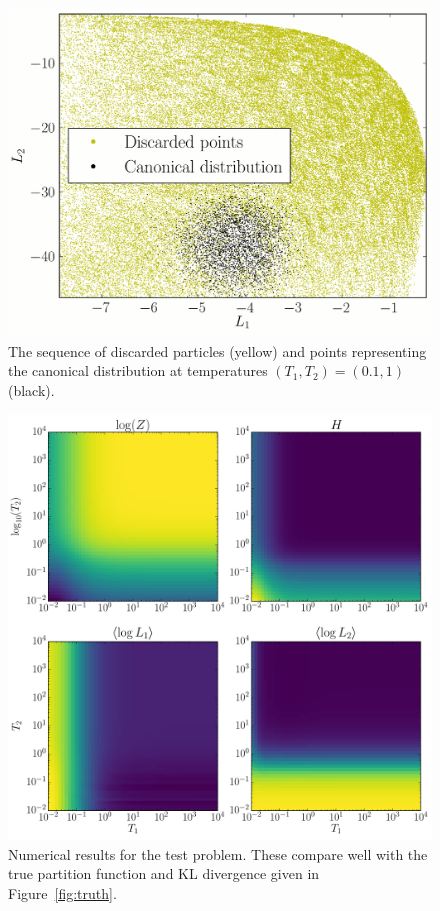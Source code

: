 \documentclass[journal,article,accept,moreauthors,pdftex,12pt,a4paper]{mdpi}
\begin{document}
\begin{figure}
\centering
\includegraphics[scale=1]{figures/output.png}
\caption{The sequence of discarded particles (yellow) and
points representing the canonical distribution at temperatures
$(T_1, T_2) = (0.1, 1)$ (black).\label{fig:output}}
\end{figure}



\begin{figure}
\centering
\includegraphics[scale=0.5]{figures/results.pdf}
\caption{Numerical results for the test problem. These compare well with the
true partition function and KL divergence given in Figure~\ref{fig:truth}.
\label{fig:results}}
\end{figure}
\end{document}
